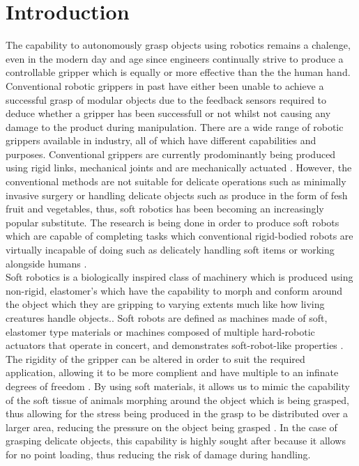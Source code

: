 \documentclass[11pt]{article}
\begin{document}
\section{Introduction}
The capability to autonomously grasp objects using robotics remains a chalenge, even in the modern day and age since engineers continually strive to produce a controllable gripper which is equally or more effective than the the human hand. Conventional robotic grippers in past have either been unable to achieve a successful grasp of modular objects due to the feedback sensors required to deduce whether a gripper has been successfull or not whilst not causing any damage to the product during manipulation. There are a wide range of robotic grippers available in industry, all of which have different capabilities and purposes. Conventional grippers are currently prodominantly being produced using rigid links, mechanical joints and are mechanically actuated \cite{ilievski2011soft}. However, the conventional methods are not suitable for delicate operations such as minimally invasive surgery or handling delicate objects such as produce in the form of fesh fruit and vegetables, thus, soft robotics has been becoming an increasingly popular substitute. The research is being done in order to produce soft robots which are capable of completing tasks which conventional rigid-bodied robots are virtually incapable of doing such as delicately handling soft items or working alongside humans \cite{bilodeau2015monolithic}.
\\
\newline
Soft robotics is a biologically inspired class of machinery which is produced using non-rigid, elastomer's which have the capability to morph and conform around the object which they are gripping to varying extents much like how living creatures handle objects.\cite{ilievski2011soft,bilodeau2015monolithic,mosadegh2014pneumatic,martinez2013robotic,marchese2015recipe}. Soft robots are defined as machines made of soft, elastomer type materials or machines composed of multiple hard-robotic actuators that operate in concert, and demonstrates soft-robot-like properties \cite{ilievski2011soft}. The rigidity of the gripper can be altered in order to suit the required application, allowing it to be more complient and have multiple to an infinate degrees of freedom \cite{hassan2015design}. By using soft materials, it allows us to mimic the capability of the soft tissue of animals morphing around the object which is being grasped, thus allowing for the stress being produced in the grasp to be distributed over a larger area, reducing the pressure on the object being grasped \cite{ilievski2011soft}. In the case of grasping delicate objects, this capability is highly sought after because it allows for no point loading, thus reducing the risk of damage  during handling.
\end{document}
